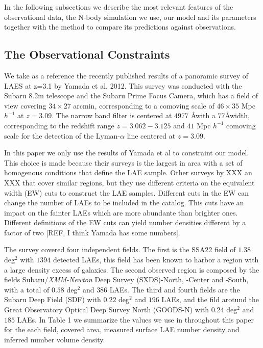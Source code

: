 \documentclass{emulateapj}
\begin{document}
In the following subsections we describe the most relevant features of the observational data, the N-body simulation we use, our model and its parameters together with the method to compare its predictions against observations.

\subsection{The Observational Constraints}
We take as a reference the recently published results of a panoramic survey of LAES at z=3.1 by Yamada et al. 2012. This survey was conducted with the Subaru 8.2m telescope and the Subaru Prime Focus Camera, which has a field of view covering $34\times 27$ arcmin, corresponding to a comoving scale of $46\times35$ Mpc $h^{-1}$ at $z=3.09$. The narrow band filter is centered at $4977$ \AA with a $77$\AA width, corresponding to the redshift range $z=3.062-3.125$ and $41$ Mpc $h^{-1}$ comoving scale for the detection of the Lyman-$\alpha$ line centered at $z=3.09$.

In this paper we only use the results of Yamada et al to constraint our model. This choice is made because their surveys is the largest in area with a set of homogenous conditions that define the LAE sample. Other surveys by XXX an XXX that cover similar regions, but they use different criteria on the equivalent width (EW) cuts to construct the LAE samples. Different cuts in the EW can change the number of LAEs to be included in the catalog. This cuts have an impact on the fainter LAEs which are more abundante than brighter ones. Different definitions of the EW cuts can yield number densities different by a factor of two [REF, I think Yamada has some numbers].


The survey covered four independent fields. The first is the SSA22 field of $1.38$ deg$^2$ with $1394$ detected LAEs, this field has been known to harbor a region with a large density excess of galaxies. The second observed region is composed by the fields Subaru/{\it XMM-Newton} Deep Survey (SXDS)-North, -Center and -South, with a total of $0.58$ deg$^2$ and $386$ LAEs. The third and fourth fields are the Subaru Deep Field (SDF) with $0.22$ deg$^2$ and $196$ LAEs, and the fild arotund the Great Observatory Optical Deep Survey North (GOODS-N) with $0.24$ deg$^2$ and $185$ LAEs. In Table 1 we summarize the values we use in throughout this paper for the each field, covered area, measured surface LAE number density and inferred number volume density.
\end{document}
